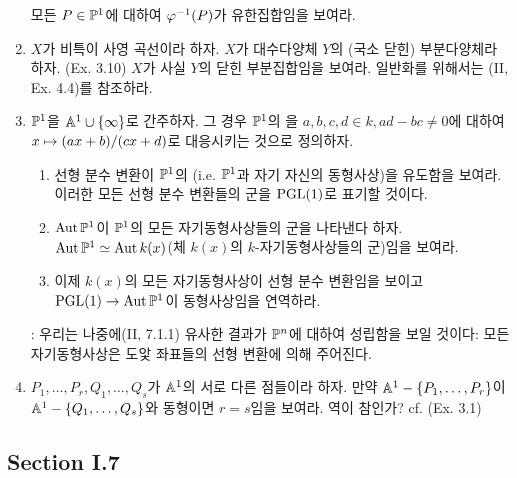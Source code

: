 \begin{enumerate}[label=\tb{6.\arabic*.},itemindent=0mm,itemsep=4mm]
		모든 $P\in\mathbb{P}^1$에 대하여 $\varphi^{-1}(P)$가 유한집합임을 보여라.
		\item $X$가 비특이 사영 곡선이라 하자. $X$가 대수다양체 $Y$의 (국소 닫힌) 부분다양체라 하자. (Ex. 3.10)
		$X$가 사실 $Y$의 닫힌 부분집합임을 보여라. 일반화를 위해서는 (II, Ex. 4.4)를 참조하라.
		\item {} $\mathbb{P}^1$을 $\mathbb{A}^1\cup\{\infty\}$로 간주하자.
		그 경우 $\mathbb{P}^1$의 을
		$a,b,c,d\in k,ad-bc\ne 0$에 대하여 $x\mapsto(ax+b)/(cx+d)$로 대응시키는 것으로 정의하자.
		\begin{enumerate}[label=(\alph*)]
			\item 선형 분수 변환이 $\mathbb{P}^1$의 (i.e. $\mathbb{P}^1$과 자기 자신의 동형사상)을 유도함을 보여라.
			이러한 모든 선형 분수 변환들의 군을 $\mathrm{PGL}(1)$로 표기할 것이다.
			\item $\operatorname{Aut}\mathbb{P}^1$이 $\mathbb{P}^1$의 모든 자기동형사상들의 군을 나타낸다 하자.
			$\operatorname{Aut}\mathbb{P}^1\simeq\operatorname{Aut} k(x)$(체 $k(x)$의 $k$-자기동형사상들의 군)임을 보여라.
			\item 이제 $k(x)$의 모든 자기동형사상이 선형 분수 변환임을 보이고 $\mathrm{PGL}(1)\rightarrow\operatorname{Aut}\mathbb{P}^1$이 동형사상임을 연역하라.
		\end{enumerate}
		: 우리는 나중에(II, 7.1.1) 유사한 결과가 $\mathbb{P}^n$에 대하여 성립함을 보일 것이다:
		모든 자기동형사상은 도앛 좌표들의 선형 변환에 의해 주어진다.
		\item $P_1,\ldots,P_r,Q_1,\ldots,Q_s$가 $\mathbb{A}^1$의 서로 다른 점들이라 하자.
		만약 $\mathbb{A}^1-\{P_1,\ldots,P_r\}$이 $\mathbb{A}^1-\{Q_1,\ldots,Q_s\}$와 동형이면 $r=s$임을 보여라. 역이 참인가? cf. (Ex. 3.1)
	\end{enumerate}
	
	
	
	\subsection*{Section I.7}
	

